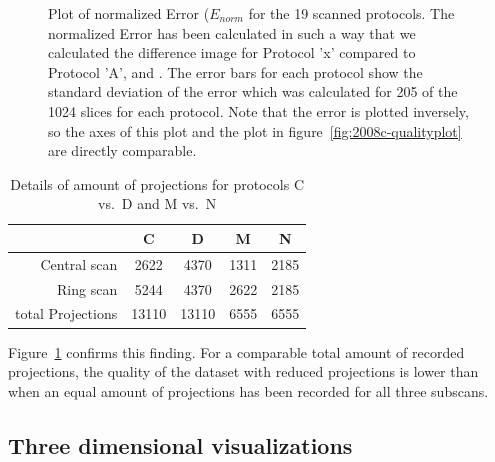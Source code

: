 \begin{figure}
	\centering
		
	\caption{Plot of normalized Error ($E_{norm}$ for the 19 scanned protocols. The normalized Error has been calculated in such a way that we calculated the difference image for Protocol 'x' compared to Protocol 'A',  and . The error bars for each protocol show the standard deviation of the error which was calculated for 205 of the 1024 slices for each protocol. Note that the error is plotted inversely, so the axes of this plot and the plot in figure~\ref{fig:2008c-qualityplot} are directly comparable.}
	\label{fig:NormalizedErrorPlot}
\end{figure}

\begin{table}%
	\centering
	\caption{Details of amount of projections for protocols C vs.\ D and M vs.\ N}
	\begin{tabular}{rcccc}
		\toprule
							& C 	& D 	& M 	& N \\
		\midrule
		Central scan		& 2622 	& 4370	& 1311 	& 2185 \\
		Ring scan	 		& 5244 	& 4370  & 2622 	& 2185 \\
		\midrule
		total Projections	& 13110	& 13110	& 6555	& 6555 \\
		\bottomrule
	\end{tabular}  
	\label{tab:detailsCDMN}
\end{table}

Figure~\ref{fig:NormalizedErrorPlot} confirms this finding. For a comparable total amount of recorded projections, the quality of the dataset with reduced projections is lower than when an equal amount of projections has been recorded for all three subscans.

\subsection{Three dimensional visualizations}
